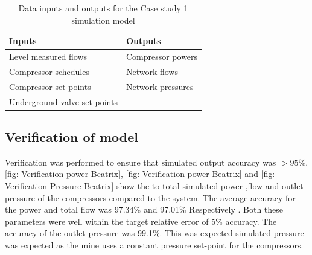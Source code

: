 \begin{table}[h]
	\centering
	\begin{tabular}{ll}
		\hline
		Inputs \hspace*{4cm}    &Outputs \hspace*{4cm}    \\  \hline
		Level measured flows&Compressor powers \\
		Compressor schedules& Network flows \\
		Compressor set-points& Network pressures \\
		Underground valve set-points&  \\
		\hline
	\end{tabular}
	\caption{Data inputs and outputs for the Case study 1 simulation model }
	\label{table: Mine A inputs/outputs}
\end{table}


\subsection{Verification of model}
Verification was performed to ensure that simulated output accuracy was $>95$\%. \cref{fig: Verification power Beatrix}, \cref{fig: Verification power Beatrix} and \cref{fig: Verification Pressure Beatrix} show the to total simulated power ,flow and outlet pressure of the compressors compared to the system. The average accuracy for the power and total flow was 97.34\%  and  97.01\% Respectively . Both these parameters were well within the target relative error of 5\% accuracy. The accuracy of the outlet pressure was 99.1\%. This was expected simulated pressure was expected as the mine uses a constant pressure set-point for the compressors.

